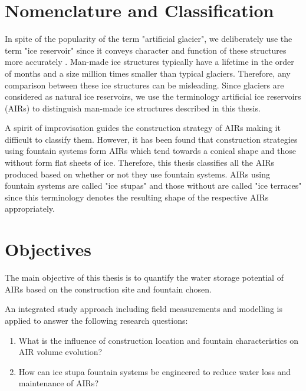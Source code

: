 \section{Nomenclature and Classification}

In spite of the popularity of the term "artificial glacier", we deliberately use the term "ice reservoir" since
it conveys character and function of these structures more accurately
\citep{nusserSociohydrologyArtificialGlaciers2019}. Man-made ice structures typically have a lifetime in the
order of months and a size million times smaller than typical glaciers. Therefore, any comparison between these
ice structures can be misleading. Since glaciers are considered as natural ice reservoirs, we use the
terminology artificial ice reservoirs (AIRs) to distinguish man-made ice structures described in this thesis. 

A spirit of improvisation guides the construction strategy of AIRs making it difficult to classify them.
However, it has been found that construction strategies using fountain systems form AIRs which tend towards a
conical shape and those without form flat sheets of ice. Therefore, this thesis classifies all the AIRs produced
based on whether or not they use fountain systems. AIRs using fountain systems are called "ice stupas" and those
without are called "ice terraces" since this terminology denotes the resulting shape of the respective AIRs
appropriately.

\section{Objectives}

The main objective of this thesis is to quantify the water storage potential of AIRs based on the construction
site and fountain chosen. 

An integrated study approach including field measurements and modelling is applied to answer the following
research questions: 

\begin{enumerate}

\item What is the influence of construction location and fountain characteristics on AIR volume evolution? 

\item How can ice stupa fountain systems be engineered to reduce water loss and maintenance of AIRs?

\end{enumerate}

